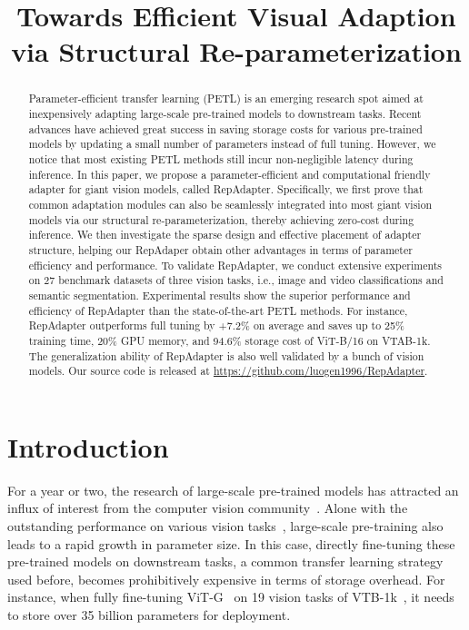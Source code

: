 \title{Towards Efficient Visual Adaption via Structural Re-parameterization}

\begin{abstract}
Parameter-efficient transfer learning (PETL) is an emerging research spot aimed at inexpensively adapting large-scale pre-trained models to downstream tasks.  Recent advances have achieved great success in saving storage costs for various pre-trained models by updating  a small number of parameters instead of full tuning. However, we notice that most existing PETL methods still incur non-negligible latency during inference.  In this paper, we propose a parameter-efficient and computational  friendly adapter for giant vision models, called RepAdapter.  Specifically, we   first prove that common adaptation modules  can also be seamlessly  integrated   into most giant vision models via   our structural re-parameterization,  thereby achieving    zero-cost  during inference.    We then investigate the sparse design and effective placement of adapter structure, helping our RepAdaper obtain other advantages in terms of parameter efficiency and performance.    To validate RepAdapter, we conduct extensive experiments on 27 benchmark datasets of three vision tasks, i.e., image and video classifications and semantic segmentation. Experimental results show the superior performance and efficiency of RepAdapter  than the state-of-the-art PETL methods.  For instance,  RepAdapter outperforms full tuning by +7.2\% on average and saves up to 25\% training time, 20\% GPU memory, and 94.6\% storage cost of ViT-B/16 on VTAB-1k. The generalization ability  of RepAdapter is also well validated by a bunch of vision models. Our source code is  released at \url{https://github.com/luogen1996/RepAdapter}.
\end{abstract}

\section{Introduction}
\label{sec:intro}
For a year or two, the research of large-scale pre-trained models has attracted an influx of interest from the computer vision community~\cite{vit,videomae,mae,vitg,clip}.  Alone with the outstanding performance on various vision tasks~\cite{imagenet,vtab,ade20k,ssv2,hmdb},  large-scale pre-training  also leads  to  a rapid growth in parameter size.  In this case, directly fine-tuning these  pre-trained  models on downstream tasks, a common transfer learning strategy used before, becomes prohibitively expensive in terms of storage overhead. For instance, when fully fine-tuning ViT-G~\cite{vitg} on 19 vision tasks of VTB-1k~\cite{vtab}, it needs to store over 35 billion parameters for deployment.

